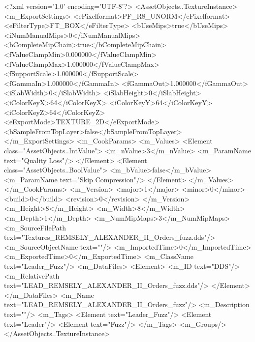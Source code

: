 <?xml version='1.0' encoding='UTF-8'?>
<AssetObjects..TextureInstance>
  <m_ExportSettings>
    <ePixelformat>PF_R8_UNORM</ePixelformat>
    <eFilterType>FT_BOX</eFilterType>
    <bUseMips>true</bUseMips>
    <iNumManualMips>0</iNumManualMips>
    <bCompleteMipChain>true</bCompleteMipChain>
    <fValueClampMin>0.000000</fValueClampMin>
    <fValueClampMax>1.000000</fValueClampMax>
    <fSupportScale>1.000000</fSupportScale>
    <fGammaIn>1.000000</fGammaIn>
    <fGammaOut>1.000000</fGammaOut>
    <iSlabWidth>0</iSlabWidth>
    <iSlabHeight>0</iSlabHeight>
    <iColorKeyX>64</iColorKeyX>
    <iColorKeyY>64</iColorKeyY>
    <iColorKeyZ>64</iColorKeyZ>
    <eExportMode>TEXTURE_2D</eExportMode>
    <bSampleFromTopLayer>false</bSampleFromTopLayer>
  </m_ExportSettings>
  <m_CookParams>
    <m_Values>
      <Element class="AssetObjects..IntValue">
        <m_nValue>3</m_nValue>
        <m_ParamName text="Quality Loss"/>
      </Element>
      <Element class="AssetObjects..BoolValue">
        <m_bValue>false</m_bValue>
        <m_ParamName text="Skip Compression"/>
      </Element>
    </m_Values>
  </m_CookParams>
  <m_Version>
    <major>1</major>
    <minor>0</minor>
    <build>0</build>
    <revision>0</revision>
  </m_Version>
  <m_Height>8</m_Height>
  <m_Width>8</m_Width>
  <m_Depth>1</m_Depth>
  <m_NumMipMaps>3</m_NumMipMaps>
  <m_SourceFilePath text="Textures\LEAD_REMSELY_ALEXANDER_II_Orders_fuzz.dds"/>
  <m_SourceObjectName text=""/>
  <m_ImportedTime>0</m_ImportedTime>
  <m_ExportedTime>0</m_ExportedTime>
  <m_ClassName text="Leader_Fuzz"/>
  <m_DataFiles>
    <Element>
      <m_ID text="DDS"/>
      <m_RelativePath text="LEAD_REMSELY_ALEXANDER_II_Orders_fuzz.dds"/>
    </Element>
  </m_DataFiles>
  <m_Name text="LEAD_REMSELY_ALEXANDER_II_Orders_fuzz"/>
  <m_Description text=""/>
  <m_Tags>
    <Element text="Leader_Fuzz"/>
    <Element text="Leader"/>
    <Element text="Fuzz"/>
  </m_Tags>
  <m_Groups/>
</AssetObjects..TextureInstance>
